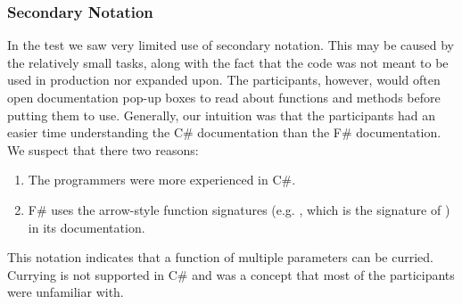 \subsubsection{Secondary Notation}
In the test we saw very limited use of secondary notation. This may be caused by the relatively small tasks, along with the fact that the code was not meant to be used in production nor expanded upon. The participants, however, would often open documentation pop-up boxes to read about functions and methods before putting them to use. Generally, our intuition was that the participants had an easier time understanding the C\# documentation than the F\# documentation. We suspect that there two reasons:
\begin{enumerate}
    \item The programmers were more experienced in C\#.
    \item F\# uses the arrow-style function signatures (e.g. , which is the signature of ) in its documentation.
\end{enumerate}
This notation indicates that a function of multiple parameters can be curried. Currying is not supported in C\# and was a concept that most of the participants were unfamiliar with.
